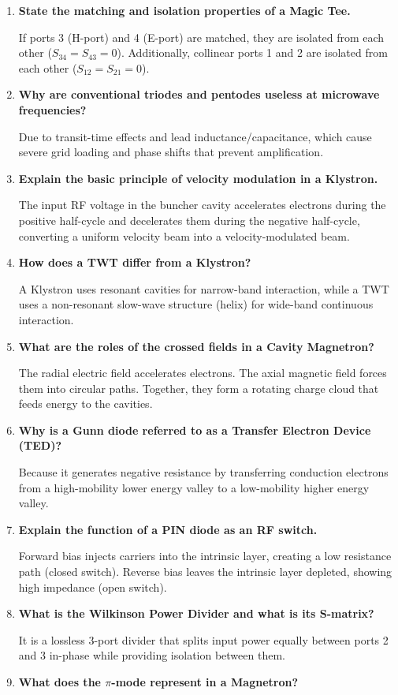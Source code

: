 \documentclass[12pt,a4paper]{article}
\newcommand{\Q}[1]{\textbf{#1}\par\noindent\ignorespaces}
\begin{document}
\begin{tcolorbox}[exambox, title={\textbf{Frequently Asked / Viva Questions}}]
\begin{enumerate}[topsep=0pt, label=\textbf{Q\arabic*.}, itemsep=5pt]
  \item \Q{State the matching and isolation properties of a Magic Tee.}
    If ports 3 (H-port) and 4 (E-port) are matched, they are isolated from each other ($S_{34} = S_{43} = 0$). Additionally, collinear ports 1 and 2 are isolated from each other ($S_{12} = S_{21} = 0$).
  \item \Q{Why are conventional triodes and pentodes useless at microwave frequencies?}
    Due to transit-time effects and lead inductance/capacitance, which cause severe grid loading and phase shifts that prevent amplification.
  \item \Q{Explain the basic principle of velocity modulation in a Klystron.}
    The input RF voltage in the buncher cavity accelerates electrons during the positive half-cycle and decelerates them during the negative half-cycle, converting a uniform velocity beam into a velocity-modulated beam.
  \item \Q{How does a TWT differ from a Klystron?}
    A Klystron uses resonant cavities for narrow-band interaction, while a TWT uses a non-resonant slow-wave structure (helix) for wide-band continuous interaction.
  \item \Q{What are the roles of the crossed fields in a Cavity Magnetron?}
    The radial electric field accelerates electrons. The axial magnetic field forces them into circular paths. Together, they form a rotating charge cloud that feeds energy to the cavities.
  \item \Q{Why is a Gunn diode referred to as a Transfer Electron Device (TED)?}
    Because it generates negative resistance by transferring conduction electrons from a high-mobility lower energy valley to a low-mobility higher energy valley.
  \item \Q{Explain the function of a PIN diode as an RF switch.}
    Forward bias injects carriers into the intrinsic layer, creating a low resistance path (closed switch). Reverse bias leaves the intrinsic layer depleted, showing high impedance (open switch).
  \item \Q{What is the Wilkinson Power Divider and what is its S-matrix?}
    It is a lossless 3-port divider that splits input power equally between ports 2 and 3 in-phase while providing isolation between them.
  \item \Q{What does the $\pi$-mode represent in a Magnetron?}

\end{enumerate}
\end{tcolorbox}
\end{document}
